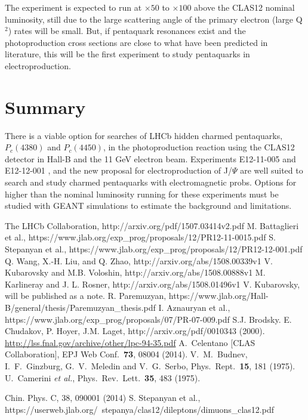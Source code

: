 \documentclass[12pt]{revtex4}
\begin{document}
The experiment is expected to run at $\times 50$ to $\times 100$ above the CLAS12 nominal luminosity, still due to the large scattering angle of the primary electron (large Q$^2$) rates will be  small. But, if pentaquark resonances exist and the photoproduction cross sections are close to what have been predicted in literature, this will be the first experiment to study pentaquarks in electroproduction.     

\section{Summary}

There is a viable option for searches of LHCb hidden charmed pentaquarks, $P_c(4380)$ and $P_c(4450)$, in the photoproduction reaction using the CLAS12 detector in Hall-B and the 11 GeV electron beam. Experiments E12-11-005 \cite{e1211005} and E12-12-001 \cite{e1212001}, and the new proposal for electroproduction of J/$\Psi$ are well suited to search and study charmed pentaquarks with electromagnetic probs. Options for higher than the nominal luminosity running for these experiments must be studied with GEANT simulations to estimate the background and limitations. 

\begin{thebibliography}{99}

The LHCb Collaboration, http://arxiv.org/pdf/1507.03414v2.pdf
 M. Battaglieri et al., https://www.jlab.org/exp\_prog/proposals/12/PR12-11-0015.pdf
 S. Stepanyan et al., https://www.jlab.org/exp\_prog/proposals/12/PR12-12-001.pdf
Q. Wang, X.-H. Liu, and Q. Zhao, http://arxiv.org/abs/1508.00339v1
 V. Kubarovsky and M.B. Voloshin, http://arxiv.org/abs/1508.00888v1
 M. Karlineray and J. L. Rosner, http://arxiv.org/abs/1508.01496v1
 V. Kubarovsky, will be published as a note.
R. Paremuzyan, https://www.jlab.org/Hall-B/general/thesis/Paremuzyan\_thesis.pdf
I. Aznauryan et al., https://www.jlab.org/exp\_prog/proposals/07/PR-07-009.pdf
 S.J. Brodsky. E. Chudakov, P. Hoyer, J.M. Laget, http://arxiv.org/pdf/0010343 (2000).
 \url{ http://lss.fnal.gov/archive/other/lpc-94-35.pdf}
 A.~Celentano [CLAS Collaboration], EPJ Web Conf.\  {\bf 73}, 08004 (2014).
 V.~M.~Budnev, I.~F.~Ginzburg, G.~V.~Meledin and V.~G.~Serbo, Phys.\ Rept.\  {\bf 15}, 181 (1975).
 U.~Camerini {\it et al.},  Phys.\ Rev.\ Lett.\  {\bf 35}, 483 (1975).

 Chin. Phys. C, 38, 090001 (2014)
 S. Stepanyan et al., https://userweb.jlab.org/~stepanya/clas12/dileptons/dimuons\_clas12.pdf

\end{thebibliography}
\end{document}

